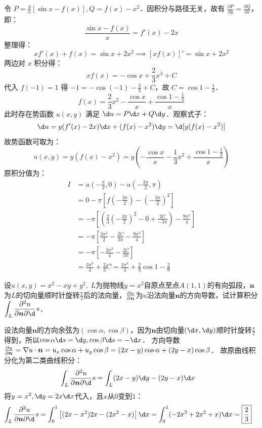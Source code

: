 \documentclass[12pt, a4paper, oneside, UTF8]{ctexbook}
\begin{document}
\begin{solution}
    令 $P = \frac{y}{x}[\sin x-f(x)], Q = f(x)-x^2$．因积分与路径无关，故有 $\frac{\partial P}{\partial y} = \frac{\partial Q}{\partial x}$，即：
    \[ \frac{\sin x - f(x)}{x} = f'(x) - 2x \]
    整理得：
    \[ x f'(x) + f(x) = \sin x + 2x^2 \implies [x f(x)]' = \sin x + 2x^2 \]
    两边对 $x$ 积分得：
    \[ x f(x) = -\cos x + \frac{2}{3}x^3 + C \]
    代入 $f(-1)=1$ 得 $-1 = -\cos(-1) - \frac{2}{3} + C$，故 $C = \cos 1 - \frac{1}{3}$．
    \[ f(x) = \frac{2}{3}x^2 - \frac{\cos x}{x} + \frac{\cos 1 - \frac{1}{3}}{x} \]
    此时存在势函数 $u(x,y)$ 满足 $\d u = P \d x + Q \d y$．观察式子：
    \[ \d u = y(f'(x)-2x) \d x + (f(x)-x^2) \d y = \d[y(f(x)-x^2)] \]
    故势函数可取为：
    \[ u(x,y) = y(f(x) - x^2) = y \left( -\frac{\cos x}{x} - \frac{1}{3}x^2 + \frac{\cos 1 - \frac{1}{3}}{x} \right) \]
    原积分值为：
    \begin{align*}
        I &= u\left(-\frac{\pi}{2}, 0\right) - u\left(-\frac{3\pi}{2}, \pi\right) \\
        &= 0 - \pi \left[ f\left(-\frac{3\pi}{2}\right) - \left(-\frac{3\pi}{2}\right)^2 \right] \\
        &= -\pi \left[ \left( \frac{2}{3}\left(-\frac{3\pi}{2}\right)^2 - 0 + \frac{2C}{-3\pi} \right) - \frac{9\pi^2}{4} \right] \\
        &= -\pi \left[ \frac{3\pi^2}{2} - \frac{2C}{3\pi} - \frac{9\pi^2}{4} \right] \\
        &= -\pi \left[ -\frac{3\pi^2}{4} - \frac{2C}{3\pi} \right] \\
        &= \frac{3\pi^3}{4} + \frac{2}{3}C = \boxed{\frac{3\pi^3}{4} + \frac{2}{3}\cos 1 - \frac{2}{9}}
    \end{align*}
\end{solution}
\begin{exercise}
    设$u(x,y)=x^2-xy+y^2,\;L$为抛物线$y=x^2$自原点至点$A(1,1)$的有向弧段，$\bm{n}$为$L$的切向量顺时针旋转$\frac{\pi}{2}$后的法向量，$\pdv{u}{\bm{n}}$为$u$沿法向量$\bm{n}$的方向导数，试计算积分$\displaystyle\int_L \pdv{u}{\bm{n}}\d s$．
\end{exercise}
\begin{solution}
    设法向量$\bm{n}$的方向余弦为$(\cos\alpha, \cos\beta)$，因为$\bm{n}$由切向量$(\d x, \d y)$顺时针旋转$\frac{\pi}{2}$得到，所以$\cos\alpha\d s = \d y, \cos\beta\d s = -\d x$．
    方向导数 $\pdv{u}{\bm{n}} = \nabla u \cdot \bm{n} = u_x \cos\alpha + u_y \cos\beta = (2x-y)\cos\alpha + (2y-x)\cos\beta$．
    故原曲线积分化为第二类曲线积分：
    \begin{align*}
        \int_L \pdv{u}{\bm{n}}\d s &= \int_L (2x-y)\d y - (2y-x)\d x
    \end{align*}
    将$y=x^2, \d y=2x\d x$代入，且$x$从$0$变到$1$：
    \begin{align*}
        \int_L \pdv{u}{\bm{n}}\d s &= \int_0^1 \left[ (2x-x^2)2x - (2x^2-x) \right] \d x = \int_0^1 (-2x^3 + 2x^2 + x) \d x = \boxed{\frac{2}{3}}
    \end{align*}
\end{solution}
\end{document}
